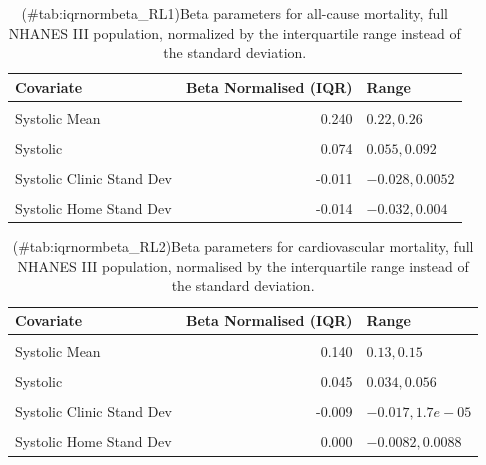 \documentclass[
]{article}
\begin{document}
\begin{table}[!h]
\centering
\caption{(\#tab:iqrnormbeta_RL1)Beta parameters for all-cause mortality, full NHANES III population, normalized by the interquartile range instead of the standard deviation.}
\centering
\begin{tabular}[t]{lrl}
\toprule
Covariate & Beta Normalised (IQR) & Range\\
\midrule
\cellcolor{gray!10}{Diastolic Mean} & \cellcolor{gray!10}{-0.077} & \cellcolor{gray!10}{\(-0.097,-0.057\)}\\
Systolic Mean & 0.240 & \(0.22,0.26\)\\
\cellcolor{gray!10}{Diastolic} & \cellcolor{gray!10}{0.052} & \cellcolor{gray!10}{\(0.026,0.078\)}\\
Systolic & 0.074 & \(0.055,0.092\)\\
\cellcolor{gray!10}{Diastolic Clinic Stand Dev} & \cellcolor{gray!10}{-0.050} & \cellcolor{gray!10}{\(-0.079,-0.022\)}\\
Systolic Clinic Stand Dev & -0.011 & \(-0.028,0.0052\)\\
\cellcolor{gray!10}{Diastolic Home Stand Dev} & \cellcolor{gray!10}{0.019} & \cellcolor{gray!10}{\(-0.0059,0.044\)}\\
Systolic Home Stand Dev & -0.014 & \(-0.032,0.004\)\\
\bottomrule
\end{tabular}
\end{table}

\begin{table}[!h]
\centering
\caption{(\#tab:iqrnormbeta_RL2)Beta parameters for cardiovascular mortality, full NHANES III population, normalised by the interquartile range instead of the standard deviation.}
\centering
\begin{tabular}[t]{lrl}
\toprule
Covariate & Beta Normalised (IQR) & Range\\
\midrule
\cellcolor{gray!10}{Diastolic Mean} & \cellcolor{gray!10}{-0.049} & \cellcolor{gray!10}{\(-0.061,-0.038\)}\\
Systolic Mean & 0.140 & \(0.13,0.15\)\\
\cellcolor{gray!10}{Diastolic} & \cellcolor{gray!10}{0.053} & \cellcolor{gray!10}{\(0.038,0.068\)}\\
Systolic & 0.045 & \(0.034,0.056\)\\
\cellcolor{gray!10}{Diastolic Clinic Stand Dev} & \cellcolor{gray!10}{-0.019} & \cellcolor{gray!10}{\(-0.034,-0.0044\)}\\
Systolic Clinic Stand Dev & -0.009 & \(-0.017,1.7e-05\)\\
\cellcolor{gray!10}{Diastolic Home Stand Dev} & \cellcolor{gray!10}{0.012} & \cellcolor{gray!10}{\(-6e-04,0.025\)}\\
Systolic Home Stand Dev & 0.000 & \(-0.0082,0.0088\)\\
\bottomrule
\end{tabular}
\end{table}
\end{document}
